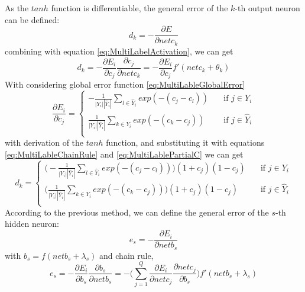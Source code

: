 As the $tanh$ function is differentiable, the general error of the $k$-th output neuron can be defined:
\begin{equation}\label{eq:MultiLableErrorDif}
d_{k} = -\frac{\partial E}{\partial netc_{k}}
\end{equation}
combining with equation \ref{eq:MultiLabelActivation}, we can get
\begin{equation}\label{eq:MultiLableChainRule}
d_{k} = -\frac{\partial E_{i}}{\partial c_{j}} \frac{\partial c_{j}}{\partial netc_{k}} = - \frac{\partial E_{i}}{\partial c_{j}} f'(netc_{k} + \theta_{k})
\end{equation}
With considering global error function \ref{eq:MultiLableGlobalError}
\begin{equation}\label{eq:MultiLablePartialC}
\frac{\partial E_{i}}{\partial c_{j}}= 
\begin{cases}
    -\frac{1}{|Y_{i}||\hat{Y}_{i}|} \sum_{l \in \hat{Y}_{i}} exp(-(c_{j} - c_{l}))       & \quad \text{if } j \in Y_{i}\\
    \frac{1}{|Y_{i}||\hat{Y}_{i}|} \sum_{k \in Y_{i}} exp(-(c_{k} - c_{j}))       & \quad \text{if } j \in \hat{Y}_{i}\\
  \end{cases}
\end{equation}
with derivation of the $tanh$ function, and substituting it with equations \ref{eq:MultiLableChainRule} and \ref{eq:MultiLablePartialC} we can get
\begin{equation}\label{eq:MultiLableGenErr}
d_{k}= 
\begin{cases}
    \big(-\frac{1}{|Y_{i}||\hat{Y}_{i}|} \sum_{l \in \hat{Y}_{i}} exp(-(c_{j} - c_{l}))\big)(1+c_{j})(1-c_{j})       & \quad \text{if } j \in Y_{i}\\
    \big(\frac{1}{|Y_{i}||\hat{Y}_{i}|} \sum_{k \in Y_{i}} exp(-(c_{k} - c_{j}))\big)(1+c_{j})(1-c_{j})       & \quad \text{if } j \in \hat{Y}_{i}\\
  \end{cases}
\end{equation}
According to the previous method, we can define the general error of the $s$-th hidden neuron:
\begin{equation}\label{eq:MultiLableGenErrS}
e_{s} = - \frac{\partial E_{i}}{\partial netb_{s}}
\end{equation}
with $b_{s} = f(netb_{s} + \lambda_{s})$ and chain rule,
\begin{equation}\label{eq:MultiLablePartialE}
e_{s} = - \frac{\partial E_{i}}{\partial b_{s}} \frac{\partial b_{s}}{\partial netb_{s}} = - \big( \sum_{j=1}^Q \frac{\partial E_{i}}{\partial netc_{j}} \frac{\partial netc_{j}}{\partial b_{s}}\big)f'(netb_{s} + \lambda_{s})
\end{equation}
